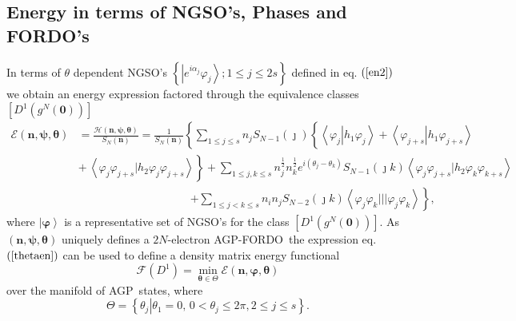 \documentclass[aps,preprint]{revtex4}%
\begin{document}
\subsection{Energy in terms of NGSO's, Phases and FORDO's\label{EnON_NGSO}}

In terms of $\theta$ dependent NGSO's $\left\{  \left\vert e^{i\alpha_{j}%
}\varphi_{j}\right\rangle ;1\leq j\leq2s\right\}  $ defined in eq. $\left(
\ref{en2}\right)  $ we obtain an energy expression factored through the
equivalence classes $\left[  D^{1}\left(  g^{N}\left(  \mathbf{0}\right)
\right)  \right]  $
\begin{align}
\mathcal{E}\left(  \mathbf{n},\mathbf{\psi},\mathbf{\theta}\right)   &
=\frac{\mathcal{H}\left(  \mathbf{n},\mathbf{\psi},\mathbf{\theta}\right)
}{S_{N}\left(  \mathbf{n}\right)  }=\frac{1}{S_{N}\left(  \mathbf{n}\right)
}\left\{  \sum_{1\leq j\leq s}n_{j}S_{N-1}\left(  \jmath\right)  \left\{
\overset{}{\left\langle \varphi_{j}\left\vert h_{1}\varphi_{j}\right.
\right\rangle +\left\langle \varphi_{j+s}\left\vert h_{1}\varphi_{j+s}\right.
\right\rangle }\right.  \right. \nonumber\\
&  \left.  +\overset{}{\,\left\langle \varphi_{j}\varphi_{j+s}|h_{2}%
\varphi_{j}\varphi_{j+s}\right\rangle }\right\}  +\sum_{1\leq j,k\leq s}%
n_{j}^{\frac{1}{2}}n_{k}^{\frac{1}{2}}e^{i\left(  \theta_{j}-\theta
_{k}\right)  }S_{N-1}\left(  \jmath k\right)  \left\langle \varphi_{j}%
\varphi_{j+s}|h_{2}\varphi_{k}\varphi_{k+s}\right\rangle \nonumber\\
&  \qquad\qquad\qquad\qquad\qquad\left.  +\sum_{1\leq j<k\leq s}n_{i}%
n_{j}S_{N-2}\left(  \jmath k\right)  \left\langle \varphi_{j}\varphi
_{k}|||\varphi_{j}\varphi_{k}\right\rangle \right\}  , \label{thetaen}%
\end{align}
where $\left\vert \mathbf{\varphi}\right\rangle $ is a representative set of
NGSO's for the class $\left[  D^{1}\left(  g^{N}\left(  \mathbf{0}\right)
\right)  \right]  $. As $\left(  \mathbf{n},\mathbf{\psi,\theta}\right)  $
uniquely defines a $2N$-electron AGP-FORDO\ the expression eq. $\left(
\ref{thetaen}\right)  $ can be used to define a density matrix energy
functional
\begin{equation}
\mathcal{F}\left(  D^{1}\right)  =\min_{\mathbf{\theta\in}\Theta}%
\mathcal{E}\left(  \mathbf{n},\mathbf{\varphi},\mathbf{\theta}\right)
\end{equation}
over the manifold of AGP\ states, where
\begin{equation}
\Theta=\left\{  \left.  \theta_{j}\right\vert \theta_{1}=0,\,0<\theta_{j}%
\leq2\pi,2\leq j\leq s\right\}  .
\end{equation}
\end{document}
